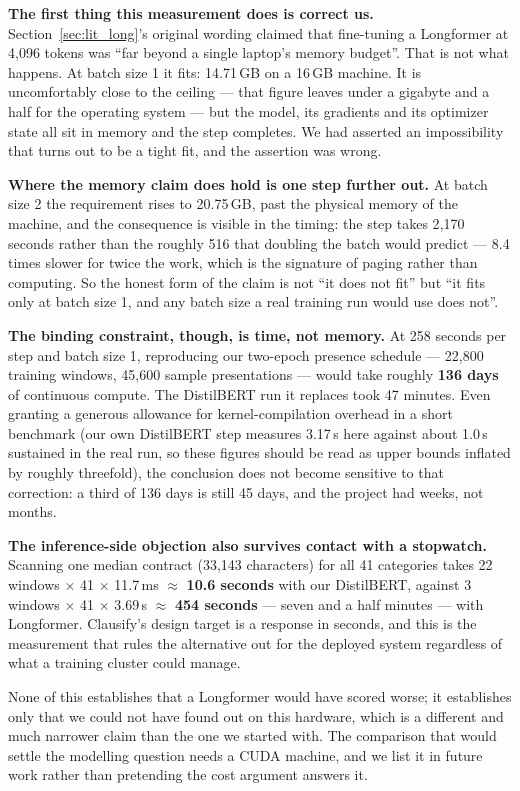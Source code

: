 \textbf{The first thing this measurement does is correct us.} Section~\ref{sec:lit_long}'s original wording claimed that fine-tuning a Longformer at 4{,}096 tokens was ``far beyond a single laptop's memory budget''. That is not what happens. At batch size 1 it fits: 14.71\,GB on a 16\,GB machine. It is uncomfortably close to the ceiling --- that figure leaves under a gigabyte and a half for the operating system --- but the model, its gradients and its optimizer state all sit in memory and the step completes. We had asserted an impossibility that turns out to be a tight fit, and the assertion was wrong.

\textbf{Where the memory claim does hold is one step further out.} At batch size 2 the requirement rises to 20.75\,GB, past the physical memory of the machine, and the consequence is visible in the timing: the step takes 2{,}170 seconds rather than the roughly 516 that doubling the batch would predict --- 8.4 times slower for twice the work, which is the signature of paging rather than computing. So the honest form of the claim is not ``it does not fit'' but ``it fits only at batch size 1, and any batch size a real training run would use does not''.

\textbf{The binding constraint, though, is time, not memory.} At 258 seconds per step and batch size 1, reproducing our two-epoch presence schedule --- 22{,}800 training windows, 45{,}600 sample presentations --- would take roughly \textbf{136 days} of continuous compute. The DistilBERT run it replaces took 47 minutes. Even granting a generous allowance for kernel-compilation overhead in a short benchmark (our own DistilBERT step measures 3.17\,s here against about 1.0\,s sustained in the real run, so these figures should be read as upper bounds inflated by roughly threefold), the conclusion does not become sensitive to that correction: a third of 136 days is still 45 days, and the project had weeks, not months.

\textbf{The inference-side objection also survives contact with a stopwatch.} Scanning one median contract (33{,}143 characters) for all 41 categories takes 22 windows $\times$ 41 $\times$ 11.7\,ms $\approx$ \textbf{10.6 seconds} with our DistilBERT, against 3 windows $\times$ 41 $\times$ 3.69\,s $\approx$ \textbf{454 seconds} --- seven and a half minutes --- with Longformer. Clausify's design target is a response in seconds, and this is the measurement that rules the alternative out for the deployed system regardless of what a training cluster could manage.

None of this establishes that a Longformer would have scored worse; it establishes only that we could not have found out on this hardware, which is a different and much narrower claim than the one we started with. The comparison that would settle the modelling question needs a CUDA machine, and we list it in future work rather than pretending the cost argument answers it.

